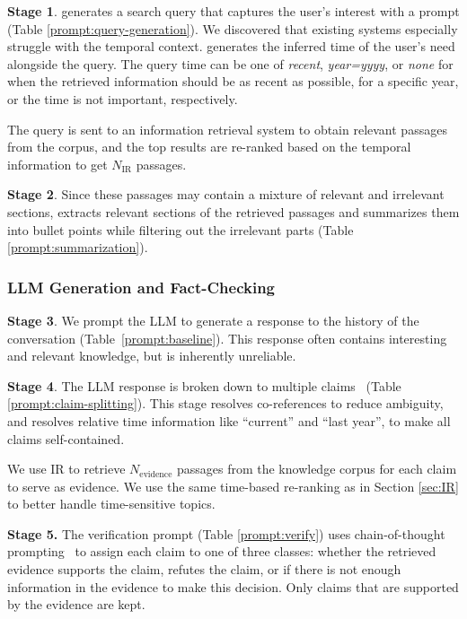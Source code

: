 {\bf Stage 1}. \system generates a search query that captures the user's interest with a prompt (Table \ref{prompt:query-generation}).
We discovered that existing systems especially struggle with the temporal context. \system generates the inferred time of the user's need alongside the query. The query time can be one of \emph{recent}, \emph{year=yyyy}, or \emph{none} for when the retrieved information should be as recent as possible, for a specific year, or the time is not important, respectively. 

The query is sent to an information retrieval system to obtain relevant passages from the corpus, and the top results are re-ranked based on the temporal information to get
$N_{\text{IR}}$ passages. 

{\bf Stage 2}.
Since these passages may contain a mixture of relevant and irrelevant sections, \system extracts relevant sections of the retrieved passages and summarizes them into bullet points while filtering out the irrelevant parts (Table \ref{prompt:summarization}).

\subsubsection{LLM Generation and Fact-Checking}
\label{sec:fact-checking}
{\bf Stage 3}. We prompt the LLM to generate a response to the history of the conversation (Table~\ref{prompt:baseline}). This response often contains interesting and relevant knowledge, but is inherently unreliable.

{\bf Stage 4}. The LLM response is broken down to multiple claims~\cite{chen-etal-2022-generating} (Table \ref{prompt:claim-splitting}). 
This stage resolves co-references to reduce ambiguity, and resolves relative time information like ``current'' and ``last year'', to make all claims self-contained.

We use IR to retrieve $N_{\text{evidence}}$ passages from the knowledge corpus for each claim to serve as evidence. We use the same time-based re-ranking as in Section \ref{sec:IR} to better handle time-sensitive topics. 

{\bf Stage 5.} The verification prompt (Table \ref{prompt:verify}) uses chain-of-thought prompting~\cite{chain-of-thought} to assign each claim to one of three classes: whether the retrieved evidence supports the claim, refutes the claim, or if there is not enough information in the evidence to make this decision. Only claims that are supported by the evidence are kept.

